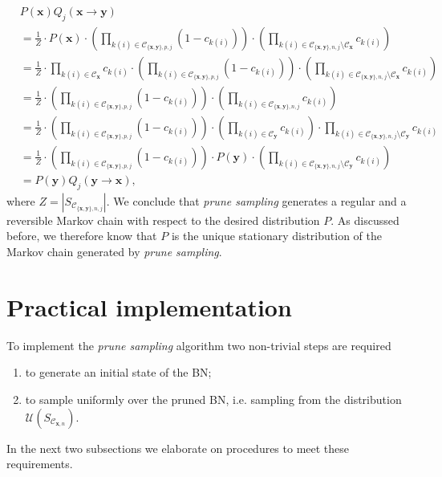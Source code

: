 \documentclass[a4paper, twoside, 11pt]{report}
\theoremstyle{plain}
\theoremstyle{definition}
\theoremstyle{remark}
\newcommand{\C}{{\mathcal C}}
\newcommand{\U}{{\mathcal{U}}}
\newcommand{\bfx}{{\mathbf{x}}}
\begin{document}
{\footnotesize \begin{align*}
&P(\mathbf{x}) {Q}_j (\mathbf{x} \to \mathbf{y}) \\
&= \frac{1}{Z} \cdot P(\mathbf{x}) \cdot \left(\prod_{k(i) \in \mathcal{C}_{\{\mathbf{x}, \mathbf{y}\}, {p}, j} } (1-c_{k(i)}) \right)\cdot \left( \prod_{k(i) \in \mathcal{C}_{\{\mathbf{x}, \mathbf{y}\}, {n}, j} \setminus \mathcal{C}_{\mathbf{x}} } c_{k(i)} \right) \\ 
&= \frac{1}{Z} \cdot \prod_{k(i) \in \mathcal{C}_{\mathbf{x}}} c_{k(i)} \cdot \left(\prod_{k(i) \in \mathcal{C}_{\{\mathbf{x}, \mathbf{y}\}, {p}, j} } (1-c_{k(i)}) \right)\cdot \left( \prod_{k(i) \in \mathcal{C}_{\{\mathbf{x}, \mathbf{y}\}, {n}, j}\setminus \mathcal{C}_{\mathbf{x}} } c_{k(i)} \right) \\ 
&= \frac{1}{Z} \cdot \left(\prod_{k(i) \in \mathcal{C}_{\{\mathbf{x}, \mathbf{y}\}, {p}, j}} (1-c_{k(i)}) \right)\cdot \left( \prod_{k(i) \in \mathcal{C}_{\{\mathbf{x}, \mathbf{y}\}, {n}, j}  } c_{k(i)}   \right) \\ 
&= \frac{1}{Z} \cdot \left(\prod_{k(i) \in \mathcal{C}_{\{\mathbf{x}, \mathbf{y}\}, {p}, j}} (1-c_{k(i)}) \right)\cdot \left( \prod_{k(i) \in \mathcal{C}_{\mathbf{y}}} c_{k(i)}   \right) \cdot  \prod_{k(i) \in \mathcal{C}_{\{\mathbf{x}, \mathbf{y}\}, {n}, j}\setminus \mathcal{C}_{\mathbf{y}}  } c_{k(i)} \\ 
&= \frac{1}{Z} \cdot \left(\prod_{k(i) \in \mathcal{C}_{\{\mathbf{x}, \mathbf{y}\}, {p}, j} } (1-c_{k(i)}) \right)\cdot P(\mathbf{y}) \cdot\left( \prod_{k(i) \in \mathcal{C}_{\{\mathbf{x}, \mathbf{y}\}, {n}, j} \setminus \mathcal{C}_{\mathbf{y}}  } c_{k(i)}   \right) \\ 
&= P(\mathbf{y}) {Q}_j (\mathbf{y} \to \mathbf{x}),
\end{align*}}
\noindent where $Z = |S_{\mathcal{C}_{\{\mathbf{x}, \mathbf{y}\}, {n}, j}}|$. We conclude that \textit{prune sampling} generates a regular and a reversible Markov chain with respect to the desired distribution $P$. As discussed before, we therefore know that $P$ is the unique stationary distribution of the Markov chain generated by \textit{prune sampling}.


\section{Practical implementation}\label{sec:prune_2}
To implement the \textit{prune sampling} algorithm two non-trivial steps are required
\begin{enumerate}
\item to generate an initial state of the BN;
\item to sample uniformly over the pruned BN, i.e. sampling from the distribution $\U(S_{\C_{\bfx,n}})$.
\end{enumerate}
In the next two subsections we elaborate on procedures to meet these requirements. 
\end{document}
